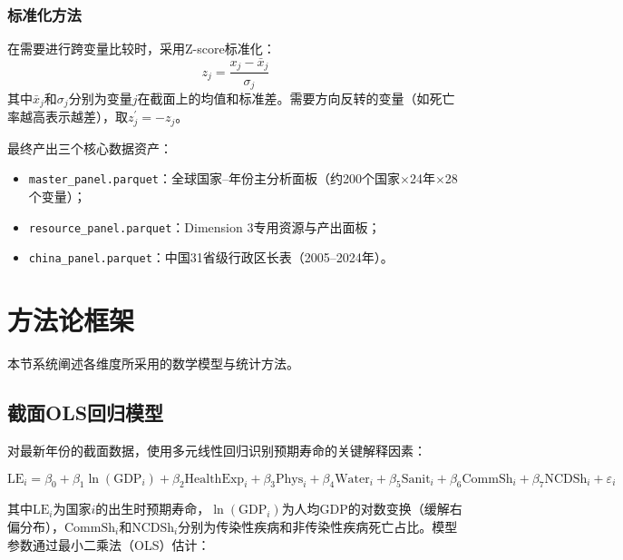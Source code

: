 \documentclass[12pt,a4paper]{ctexart}
\begin{document}
\subsubsection{标准化方法}

在需要进行跨变量比较时，采用Z-score标准化：
\begin{equation}
    z_j = \frac{x_j - \bar{x}_j}{\sigma_j}
\end{equation}
其中$\bar{x}_j$和$\sigma_j$分别为变量$j$在截面上的均值和标准差。需要方向反转的变量（如死亡率越高表示越差），取$z_j^\prime = -z_j$。

最终产出三个核心数据资产：
\begin{itemize}[leftmargin=1.5em]
    \item \texttt{master\_panel.parquet}：全球国家--年份主分析面板（约200个国家$\times$24年$\times$28个变量）；
    \item \texttt{resource\_panel.parquet}：Dimension 3专用资源与产出面板；
    \item \texttt{china\_panel.parquet}：中国31省级行政区长表（2005--2024年）。
\end{itemize}

\section{方法论框架}

本节系统阐述各维度所采用的数学模型与统计方法。

\subsection{截面OLS回归模型}

对最新年份的截面数据，使用多元线性回归识别预期寿命的关键解释因素：

\begin{equation}
\label{eq:ols}
\text{LE}_i = \beta_0 + \beta_1 \ln(\text{GDP}_i) + \beta_2 \text{HealthExp}_i + \beta_3 \text{Phys}_i + \beta_4 \text{Water}_i + \beta_5 \text{Sanit}_i + \beta_6 \text{CommSh}_i + \beta_7 \text{NCDSh}_i + \varepsilon_i
\end{equation}

其中$\text{LE}_i$为国家$i$的出生时预期寿命，$\ln(\text{GDP}_i)$为人均GDP的对数变换（缓解右偏分布），$\text{CommSh}_i$和$\text{NCDSh}_i$分别为传染性疾病和非传染性疾病死亡占比。模型参数通过最小二乘法（OLS）估计：
\end{document}
